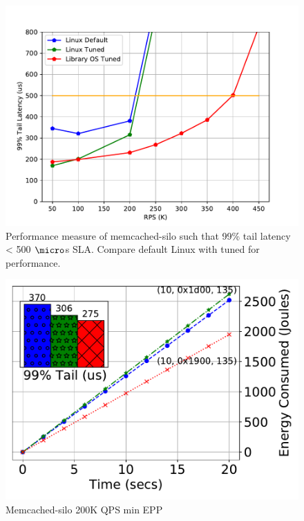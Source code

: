 \begin{figure}
	\includegraphics[width=\columnwidth]{asplos2021_figures/mcdsilo_sla.pdf}
	\caption{Performance measure of memcached-silo such that 99\% tail latency < 500 $\micro$s SLA. Compare default Linux with tuned for performance.}
	\label{fig:mcdsilo_sla_tot}
\end{figure}

\begin{figure}
  \includegraphics[width=\columnwidth]{osdi_figures/mcdsilo_200000_epp.pdf}
  \caption{Memcached-silo 200K QPS min EPP}
  \label{fig:mcdsilo200000_epp}
\end{figure}

